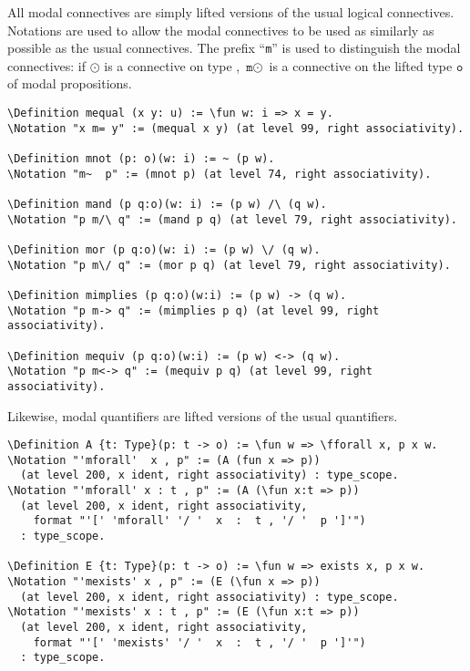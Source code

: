 \documentclass{llncs}
\newcommand{\red}[1]{\textcolor[rgb]{1,0,0}{#1}}
\newcommand{\blue}[1]{\textcolor[rgb]{0,0,1}{#1}}
\newcommand{\Definition}{\red{Definition}}
\newcommand{\Notation}{\blue{Notation}}
\newcommand{\fforall}{\blue{forall}}
\newcommand{\fun}{\blue{fun}}
\begin{document}
\noindent
All modal connectives are simply lifted versions of the usual logical connectives. Notations are used to allow the modal connectives to be used as similarly as possible as the usual connectives. The prefix ``\texttt{m}'' is used to distinguish the modal connectives: if $\odot$ is a connective on type , $\texttt{m}\odot$ is a connective on the lifted type $\texttt{o}$ of modal propositions.  

\begin{Verbatim}[commandchars=\\\{\}]
\Definition mequal (x y: u) := \fun w: i => x = y.
\Notation "x m= y" := (mequal x y) (at level 99, right associativity).

\Definition mnot (p: o)(w: i) := ~ (p w).
\Notation "m~  p" := (mnot p) (at level 74, right associativity).

\Definition mand (p q:o)(w: i) := (p w) /\ (q w).
\Notation "p m/\ q" := (mand p q) (at level 79, right associativity).

\Definition mor (p q:o)(w: i) := (p w) \/ (q w).
\Notation "p m\/ q" := (mor p q) (at level 79, right associativity).

\Definition mimplies (p q:o)(w:i) := (p w) -> (q w).
\Notation "p m-> q" := (mimplies p q) (at level 99, right associativity).

\Definition mequiv (p q:o)(w:i) := (p w) <-> (q w).
\Notation "p m<-> q" := (mequiv p q) (at level 99, right associativity).
\end{Verbatim}

\noindent
Likewise, modal quantifiers are lifted versions of the usual quantifiers.

\begin{Verbatim}[commandchars=\\\{\}]
\Definition A {t: Type}(p: t -> o) := \fun w => \fforall x, p x w.
\Notation "'mforall'  x , p" := (A (fun x => p))
  (at level 200, x ident, right associativity) : type_scope.
\Notation "'mforall' x : t , p" := (A (\fun x:t => p))
  (at level 200, x ident, right associativity, 
    format "'[' 'mforall' '/ '  x  :  t , '/ '  p ']'")
  : type_scope.

\Definition E {t: Type}(p: t -> o) := \fun w => exists x, p x w.
\Notation "'mexists' x , p" := (E (\fun x => p))
  (at level 200, x ident, right associativity) : type_scope.
\Notation "'mexists' x : t , p" := (E (\fun x:t => p))
  (at level 200, x ident, right associativity, 
    format "'[' 'mexists' '/ '  x  :  t , '/ '  p ']'")
  : type_scope.
\end{Verbatim}
\end{document}
